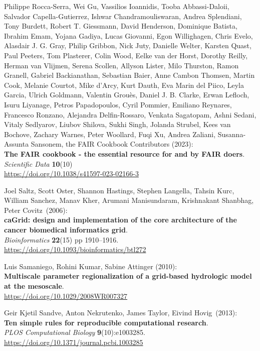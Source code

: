 \begin{thebibliography}{9}
Philippe Rocca-Serra, Wei Gu, Vassilios Ioannidis, Tooba Abbassi-Daloii,
Salvador Capella-Gutierrez, Ishwar Chandramouliswaran, Andrea
Splendiani, Tony Burdett, Robert T. Giessmann, David Henderson,
Dominique Batista, Ibrahim Emam, Yojana Gadiya, Lucas Giovanni, Egon
Willighagen, Chris Evelo, Alasdair J. G. Gray, Philip Gribbon, Nick
Juty, Danielle Welter, Karsten Quast, Paul Peeters, Tom Plasterer, Colin
Wood, Eelke van der Horst, Dorothy Reilly, Herman van Vlijmen, Serena
Scollen, Allyson Lister, Milo Thurston, Ramon Granell, Gabriel
Backianathan, Sebastian Baier, Anne Cambon Thomsen, Martin Cook, Melanie
Courtot, Mike d'Arcy, Kurt Dauth, Eva Marin del Piico, Leyla Garcia,
Ulrich Goldmann, Valentin Grouès, Daniel J. B. Clarke, Erwan Lefloch,
Isuru Liyanage, Petros Papadopoulos, Cyril Pommier, Emiliano Reynares,
Francesco Ronzano, Alejandra Delfin-Rossaro, Venkata Sagatopam, Ashni
Sedani, Vitaly Sedlyarov, Liubov Shilova, Sukhi Singh, Jolanda Strubel,
Kees van Bochove, Zachary Warnes, Peter Woollard, Fuqi Xu, Andrea
Zaliani, Susanna-Assunta Sansonem, the FAIR Cookbook Contributors (2023): \\
\textbf{The {FAIR} cookbook - the essential resource for and by {FAIR} doers}.\\
\emph{Scientific Data} \textbf{10}(10)\\
\url{https://doi.org/10.1038/s41597-023-02166-3}

Joel Saltz, Scott Oster, Shannon Hastings, Stephen Langella,
Tahsin Kurc, William Sanchez, Manav Kher, Arumani Manisundaram,
Krishnakant Shanbhag, Peter Covitz~(2006):\\
\textbf{caGrid: design and implementation of the core architecture of
the cancer biomedical informatics grid}.\\
\emph{Bioinformatics}
\textbf{22}(15) pp 1910--1916.\\
\url{https://doi.org/10.1093/bioinformatics/btl272}

Luis Samaniego, Rohini Kumar, Sabine Attinger (2010):\\
\textbf{Multiscale parameter regionalization of a grid-based hydrologic model at the mesoscale}.\\
\url{https://doi.org/10.1029/2008WR007327}

Geir Kjetil Sandve, Anton Nekrutenko, James Taylor, Eivind Hovig~(2013):\\
\textbf{Ten simple rules for reproducible computational research}.\\
\emph{PLOS Computational Biology} \textbf{9}(10):e1003285.\\
\url{https://doi.org/10.1371/journal.pcbi.1003285}


\end{thebibliography}
